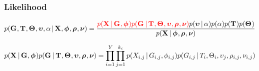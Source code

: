 \begin{frame}[t]
    \frametitle{Likelihood}
    \begin{displaybox}
        \footnotesize
        \[
            p(\geneTreeVector, \divTimeMapVector, \demographicParamVector, 
            \locusMutationRateScalarVector, \locusRateHetShapeParameter \given
            \alignmentVector, \hkyModelVector, \ploidyScalarVector,
            \mutationRateScalarConstantVector) =
            \frac{\textcolor{red}{p(\alignmentVector \given \geneTreeVector, \hkyModelVector)
                p(\geneTreeVector \given \divTimeMapVector, \demographicParamVector,
                \locusMutationRateScalarVector, \ploidyScalarVector,
                \mutationRateScalarConstantVector)}
                p(\locusMutationRateScalarVector \given \locusRateHetShapeParameter)
                p(\locusRateHetShapeParameter)
                p(\divTimeMapVector)
                p(\demographicParamVector)}{
                p(\alignmentVector \given \hkyModelVector, \ploidyScalarVector,
                \mutationRateScalarConstantVector)}
        \]\vspace{0mm}
    \end{displaybox}
    \smallskip

    \begin{displaybox}
        \footnotesize
        \[
            p(\alignmentVector \given \geneTreeVector, \hkyModelVector)
            p(\geneTreeVector \given \divTimeMapVector,
            \demographicParamVector, \locusMutationRateScalarVector,
            \ploidyScalarVector, \mutationRateScalarConstantVector) =
            \prod_{i=1}^{\npairs{}} \prod_{j=1}^{\nloci{i}} p(\alignment{i}{j}
            \given \geneTree{i}{j}, \hkyModel{i}{j}) p(\geneTree{i}{j} \given
            \divTimeMap{i}, \demographicParams{i}, \locusMutationRateScalar{j},
            \ploidyScalar{i}{j}, \mutationRateScalarConstant{i}{j})
        \]\vspace{0mm}
    \end{displaybox}
\end{frame}

